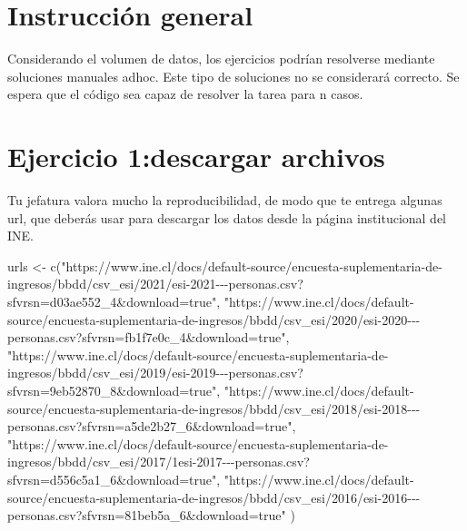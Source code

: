 \documentclass[
]{article}
\newenvironment{Shaded}{\begin{snugshade}}{\end{snugshade}}
\newcommand{\FunctionTok}[1]{\textcolor[rgb]{0.00,0.00,0.00}{#1}}
\newcommand{\NormalTok}[1]{#1}
\newcommand{\OtherTok}[1]{\textcolor[rgb]{0.56,0.35,0.01}{#1}}
\newcommand{\StringTok}[1]{\textcolor[rgb]{0.31,0.60,0.02}{#1}}
\begin{document}
\hypertarget{instrucciuxf3n-general}{%
\section{Instrucción general}\label{instrucciuxf3n-general}}

Considerando el volumen de datos, los ejercicios podrían resolverse
mediante soluciones manuales adhoc. Este tipo de soluciones no se
considerará correcto. Se espera que el código sea capaz de resolver la
tarea para n casos.

\hypertarget{ejercicio-1descargar-archivos}{%
\section{Ejercicio 1:descargar
archivos}\label{ejercicio-1descargar-archivos}}

Tu jefatura valora mucho la reproducibilidad, de modo que te entrega
algunas url, que deberás usar para descargar los datos desde la página
institucional del INE.

\begin{Shaded}
\begin{Highlighting}[]
\NormalTok{urls }\OtherTok{\textless{}{-}} \FunctionTok{c}\NormalTok{(}\StringTok{"https://www.ine.cl/docs/default{-}source/encuesta{-}suplementaria{-}de{-}ingresos/bbdd/csv\_esi/2021/esi{-}2021{-}{-}{-}personas.csv?sfvrsn=d03ae552\_4\&download=true"}\NormalTok{,}
\StringTok{"https://www.ine.cl/docs/default{-}source/encuesta{-}suplementaria{-}de{-}ingresos/bbdd/csv\_esi/2020/esi{-}2020{-}{-}{-}personas.csv?sfvrsn=fb1f7e0c\_4\&download=true"}\NormalTok{,}
\StringTok{"https://www.ine.cl/docs/default{-}source/encuesta{-}suplementaria{-}de{-}ingresos/bbdd/csv\_esi/2019/esi{-}2019{-}{-}{-}personas.csv?sfvrsn=9eb52870\_8\&download=true"}\NormalTok{,}
\StringTok{"https://www.ine.cl/docs/default{-}source/encuesta{-}suplementaria{-}de{-}ingresos/bbdd/csv\_esi/2018/esi{-}2018{-}{-}{-}personas.csv?sfvrsn=a5de2b27\_6\&download=true"}\NormalTok{,}
\StringTok{"https://www.ine.cl/docs/default{-}source/encuesta{-}suplementaria{-}de{-}ingresos/bbdd/csv\_esi/2017/1esi{-}2017{-}{-}{-}personas.csv?sfvrsn=d556c5a1\_6\&download=true"}\NormalTok{,}
\StringTok{"https://www.ine.cl/docs/default{-}source/encuesta{-}suplementaria{-}de{-}ingresos/bbdd/csv\_esi/2016/esi{-}2016{-}{-}{-}personas.csv?sfvrsn=81beb5a\_6\&download=true"}
\NormalTok{)}
\end{Highlighting}
\end{Shaded}
\end{document}
